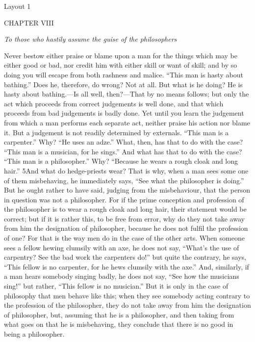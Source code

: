 
Layout 1

CHAPTER VIII

\emph{To those who hastily assume the guise of the philosophers}

Never bestow either praise or blame upon a man for the things which may be either good or bad, nor credit him with either skill or want of skill; and by so doing you will escape from both rashness and malice. ``This man is hasty about bathing.'' Does he, therefore, do wrong? Not at all. But what is he doing? He is hasty about bathing.—Is all well, then?—That by no means follows; but only the act which proceeds from correct judgements is well done, and that which proceeds from bad judgements is badly done. Yet until you learn the judgement from which a man performs each separate act, neither praise his action nor blame it. But a judgement is not readily determined by externals. ``This man is a carpenter.'' Why? ``He uses an adze.'' What, then, has that to do with the case? ``This man is a musician, for he sings.'' And what has that to do with the case? ``This man is a philosopher.'' Why? ``Because he wears a rough cloak and long hair.'' 5And what do hedge-priests wear? That is why, when a man sees some one of them misbehaving, he immediately says, ``See what the philosopher is doing.'' But he ought rather to have said, judging from the misbehaviour, that the person in question was not a philosopher. For if the prime conception and profession of the philosopher is to wear a rough cloak and long hair, their statement would be correct; but if it is rather this, to be free from error, why do they not take away from him the designation of philosopher, because he does not fulfil the profession of one? For that is the way men do in the case of the other arts. When someone sees a fellow hewing clumsily with an axe, he does not say, ``What's the use of carpentry? See the bad work the carpenters do!'' but quite the contrary, he says, ``This fellow is no carpenter, for he hews clumsily with the axe.'' And, similarly, if a man hears somebody singing badly, he does not say, ``See how the musicians sing!'' but rather, ``This fellow is no musician.'' But it is only in the case of philosophy that men behave like this; when they see somebody acting contrary to the profession of the philosopher, they do not take away from him the designation of philosopher, but, assuming that he is a philosopher, and then taking from what goes on that he is misbehaving, they conclude that there is no good in being a philosopher.

